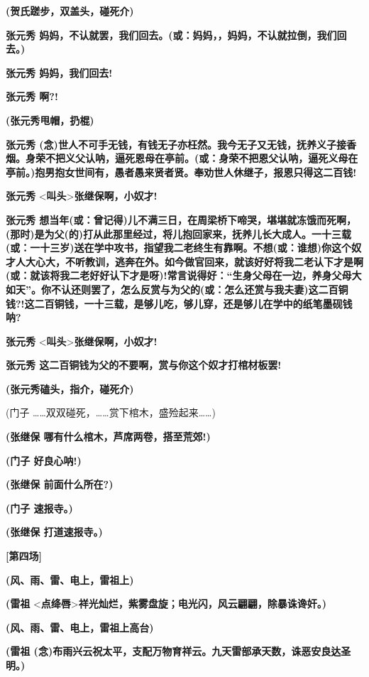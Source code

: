 \textbf{(贺氏蹉步，双盖头，碰死介)}

\textbf{张元秀
妈妈，不认就罢，我们回去。(或：妈妈，，妈妈，不认就拉倒，我们回去。)}

\textbf{张元秀 妈妈，我们回去!}

\textbf{张元秀 啊?!}

\textbf{(张元秀甩帽，扔棍)}

\textbf{张元秀
(念)世人不可手无钱，有钱无子亦枉然。我今无子又无钱，抚养义子接香烟。身荣不把义父认呐，逼死恩母在亭前。(或：身荣不把恩父认呐，逼死义母在亭前。)抱男抱女世间有，愚者愚来贤者贤。奉劝世人休继子，报恩只得这二百钱!}

\textbf{张元秀}
\textless{}\textbf{叫头}\textgreater{}\textbf{张继保啊，小奴才!}

\textbf{张元秀
想当年(或：曾记得)儿不满三日，在周梁桥下啼哭，堪堪就冻饿而死啊，(那时)是为父(的)打从此那里经过，将儿抱回家来，抚养儿长大成人。一十三载(或：一十三岁)送在学中攻书，指望我二老终生有靠啊。不想(或：谁想)你这个奴才人大心大，不听教训，逃奔在外。如今做官回来，就该好好将我二老认下才是啊(或：就该将我二老好好认下才是呀)!常言说得好：``生身父母在一边，养身父母大如天''。你不认还则罢了，怎么反赏与为父的(或：怎么还赏与我夫妻)这二百铜钱?!这二百铜钱，一十三载，是够儿吃，够儿穿，还是够儿在学中的纸笔墨砚钱呐?}

\textbf{张元秀}
\textless{}\textbf{叫头}\textgreater{}\textbf{张继保啊，小奴才!}

\textbf{张元秀 这二百铜钱为父的不要啊，赏与你这个奴才打棺材板罢!}

\textbf{(张元秀磕头，指介，碰死介)}

(门子
\ldots{}\ldots{}双双碰死，\ldots{}\ldots{}赏下棺木，盛殓起来\ldots{}\ldots{})

\textbf{(张继保 哪有什么棺木，芦席两卷，搭至荒郊!)}

\textbf{(门子 好良心呐!)}

\textbf{(张继保 前面什么所在?)}

\textbf{(门子 速报寺。)}

\textbf{(张继保 打道速报寺。)}

\textbf{{[}第四场{]}}

\textbf{(风、雨、雷、电上，雷祖上)}

\textbf{(雷祖}
\textless{}\textbf{点绛唇}\textgreater{}\textbf{祥光灿烂，紫雾盘旋；电光闪，风云翩翩，除暴诛谗奸。)}

\textbf{(风、雨、雷、电上，雷祖上高台)}

\textbf{(雷祖
(念)布雨兴云祝太平，支配万物育祥云。九天雷部承天数，诛恶安良达圣明。)}

